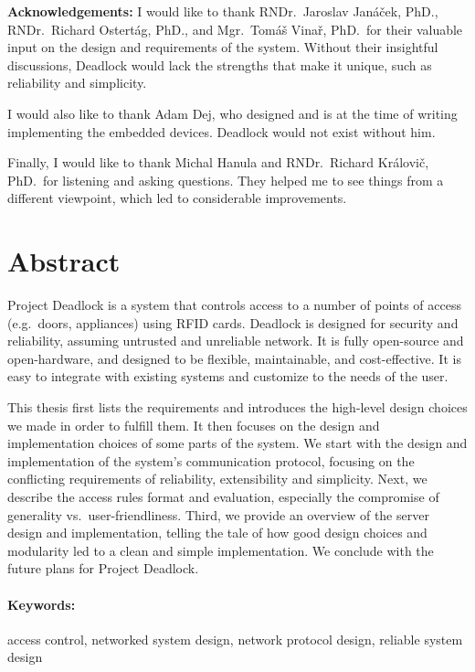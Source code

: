 \vfill
\noindent\textbf{Acknowledgements:} I would like to thank RNDr.~Jaroslav Janáček, PhD., RNDr.~Richard Ostertág, PhD., and Mgr.~Tomáš Vinař, PhD.~for their valuable input on the design and requirements of the system. Without their insightful discussions, Deadlock would lack the strengths that make it unique, such as reliability and simplicity.

I would also like to thank Adam Dej, who designed and is at the time of writing implementing the embedded devices. Deadlock would not exist without him.

Finally, I would like to thank Michal Hanula and RNDr.~Richard Královič, PhD.~for listening and asking questions. They helped me to see things from a different viewpoint, which led to considerable improvements.


\newpage
\section*{Abstract}

Project Deadlock is a system that controls access to a number of points of
access (e.g.~doors, appliances) using RFID cards. Deadlock is designed for
security and reliability, assuming untrusted and unreliable network. It is fully open-source and open-hardware, and designed  to be flexible, maintainable, and cost-effective. It is easy to integrate with existing systems and customize to the needs of the user.

This thesis first lists the requirements and introduces the high-level design choices we made in order to fulfill them.
It then focuses on the design and implementation choices of some parts of the system.
We start with the design and implementation of the system's communication protocol, focusing on the conflicting requirements of reliability, extensibility and simplicity.
Next, we describe the access rules format and evaluation, especially the compromise of generality vs.~user-friendliness.
Third, we provide an overview of the server design and implementation, telling the tale of how good design choices and modularity led to a clean and simple implementation.
We conclude with the future plans for Project Deadlock.

\paragraph*{Keywords:} access control, networked system design, network protocol design, reliable system design

